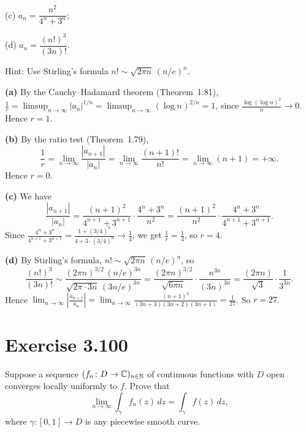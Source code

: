 \documentclass{article}
\begin{document}
(c) $a_n = \dfrac{n^2}{4^n + 3^n}$;

(d) $a_n = \dfrac{(n!)^3}{(3n)!}$.

Hint: Use Stirling's formula
$n! \sim \sqrt{2\pi n}\,(n/e)^n$.

\begin{solution}
  \textbf{(a)}\;
  By the Cauchy--Hadamard theorem (Theorem~1.81),
  $\frac{1}{r} = \limsup_{n\to\infty} |a_n|^{1/n}
  = \limsup_{n\to\infty} (\log n)^{2/n} = 1$,
  since $\frac{\log(\log n)^2}{n} \to 0$.
  Hence $r = 1$.

  \medskip

  \textbf{(b)}\;
  By the ratio test (Theorem~1.79),
  \[
    \frac{1}{r}
    = \lim_{n\to\infty} \frac{|a_{n+1}|}{|a_n|}
    = \lim_{n\to\infty} \frac{(n+1)!}{n!}
    = \lim_{n\to\infty} (n+1) = +\infty.
  \]
  Hence $r = 0$.

  \medskip

  \textbf{(c)}\;
  We have
  \[
    \frac{|a_{n+1}|}{|a_n|}
    = \frac{(n+1)^2}{4^{n+1}+3^{n+1}}
    \cdot \frac{4^n + 3^n}{n^2}
    = \frac{(n+1)^2}{n^2} \cdot \frac{4^n + 3^n}{4^{n+1}+3^{n+1}}.
  \]
  Since $\frac{4^n + 3^n}{4^{n+1}+3^{n+1}}
  = \frac{1+(3/4)^n}{4+3\cdot(3/4)^n} \to \frac{1}{4}$,
  we get $\frac{1}{r} = \frac{1}{4}$, so $r = 4$.

  \medskip

  \textbf{(d)}\;
  By Stirling's formula, $n! \sim \sqrt{2\pi n}\,(n/e)^n$, so
  \[
    \frac{(n!)^3}{(3n)!}
    \sim \frac{(2\pi n)^{3/2}\,(n/e)^{3n}}
    {\sqrt{2\pi \cdot 3n}\,(3n/e)^{3n}}
    = \frac{(2\pi n)^{3/2}}{\sqrt{6\pi n}}
    \cdot \frac{n^{3n}}{(3n)^{3n}}
    = \frac{(2\pi n)}{\sqrt{3}} \cdot \frac{1}{3^{3n}}.
  \]
  Hence
  $\lim_{n\to\infty} \left|\frac{a_{n+1}}{a_n}\right|
  = \lim_{n\to\infty} \frac{(n+1)^3}{(3n+3)(3n+2)(3n+1)}
  = \frac{1}{27}$.
  So $r = 27$.
\end{solution}

\section{Exercise 3.100}

Suppose a sequence $(f_n \colon D \to \mathbb{C})_{n\in\mathbb{N}}$
of continuous functions with $D$ open
converges locally uniformly to $f$.
Prove that
\[
  \lim_{n\to\infty} \int_\gamma f_n(z)\,dz
  = \int_\gamma f(z)\,dz,
\]
where $\gamma \colon [0,1] \to D$ is any piecewise smooth curve.
\end{document}
